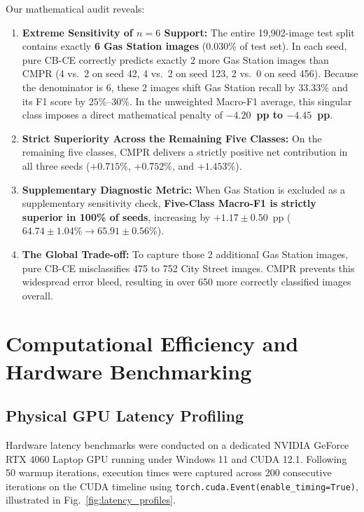 \documentclass[conference]{IEEEtran}
\begin{document}
Our mathematical audit reveals:
\begin{enumerate}
    \item \textbf{Extreme Sensitivity of $n=6$ Support:} The entire 19,902-image test split contains exactly \textbf{6 Gas Station images} (0.030\% of test set). In each seed, pure CB-CE correctly predicts exactly 2 more Gas Station images than CMPR (4 vs.\ 2 on seed 42, 4 vs.\ 2 on seed 123, 2 vs.\ 0 on seed 456). Because the denominator is 6, these 2 images shift Gas Station recall by $33.33\%$ and its F1 score by $25\%$--$30\%$. In the unweighted Macro-F1 average, this singular class imposes a direct mathematical penalty of \textbf{$-4.20$~pp to $-4.45$~pp}.
    \item \textbf{Strict Superiority Across the Remaining Five Classes:} On the remaining five classes, CMPR delivers a strictly positive net contribution in all three seeds ($+0.715\%$, $+0.752\%$, and $+1.453\%$).
    \item \textbf{Supplementary Diagnostic Metric:} When Gas Station is excluded as a supplementary sensitivity check, \textbf{Five-Class Macro-F1 is strictly superior in 100\% of seeds}, increasing by $\mathbf{+1.17 \pm 0.50}$~pp ($64.74 \pm 1.04\% \to 65.91 \pm 0.56\%$).
    \item \textbf{The Global Trade-off:} To capture those 2 additional Gas Station images, pure CB-CE misclassifies 475 to 752 City Street images. CMPR prevents this widespread error bleed, resulting in over 650 more correctly classified images overall.
\end{enumerate}

\section{Computational Efficiency and Hardware Benchmarking}

\subsection{Physical GPU Latency Profiling}
Hardware latency benchmarks were conducted on a dedicated NVIDIA GeForce RTX 4060 Laptop GPU running under Windows 11 and CUDA 12.1. Following 50 warmup iterations, execution times were captured across 200 consecutive iterations on the CUDA timeline using \texttt{torch.cuda.Event(enable\_timing=True)}, illustrated in Fig.~\ref{fig:latency_profiles}.
\end{document}
